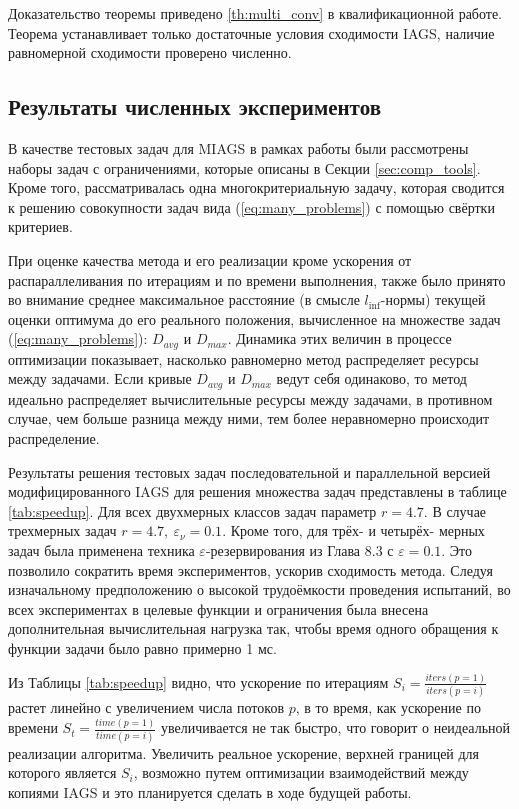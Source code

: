 Доказательство теоремы приведено \ref{th:multi_conv} в квалификационной работе.
Теорема  устанавливает только достаточные условия сходимости IAGS, наличие равномерной сходимости проверено численно.

\subsection{Результаты численных экспериментов}

В качестве тестовых задач для MIAGS в рамках работы были рассмотрены наборы задач с ограничениями, которые описаны в Секции \ref{sec:comp_tools}.
Кроме того, рассматривалась одна многокритериальную задачу, которая сводится к решению совокупности задач вида (\ref{eq:many_problems})
с помощью свёртки критериев.

При оценке качества метода и его реализации кроме ускорения от распараллеливания по итерациям и по времени выполнения,
также было принято во внимание среднее максимальное расстояние (в смысле \(l_{\inf}\)-нормы) текущей оценки оптимума до его реального положения,
вычисленное на множестве задач (\ref{eq:many_problems}): \(D_{avg}\) и \(D_{max}\). Динамика этих величин в процессе оптимизации
показывает, насколько равномерно метод распределяет ресурсы между задачами. Если кривые \(D_{avg}\) и \(D_{max}\) ведут себя одинаково, то
метод идеально распределяет вычислительные ресурсы между задачами, в противном случае, чем больше разница между
ними, тем более неравномерно происходит распределение.

Результаты решения тестовых задач последовательной и параллельной версией модифицированного IAGS
для решения множества задач представлены в таблице \ref{tab:speedup}. Для всех двухмерных классов задач параметр \(r=4.7\).
В случае трехмерных задач \(r=4.7,\: \varepsilon_\nu=0.1\).
Кроме того, для трёх- и четырёх- мерных задач была применена техника \(\varepsilon\)-резервирования из \cite{Strongin2000} Глава 8.3 с
\(\varepsilon=0.1\). Это позволило сократить время экспериментов, ускорив сходимость метода.
Следуя изначальному предположению о высокой трудоёмкости проведения испытаний,
во всех экспериментах в целевые функции и ограничения была внесена дополнительная вычислительная нагрузка так,
чтобы время одного обращения к функции задачи было равно примерно 1 мс.

Из Таблицы \ref{tab:speedup} видно, что ускорение по итерациям \(S_i=\frac{iters(p=1)}{iters(p=i)}\) растет линейно с увеличением числа потоков \(p\),
в то время, как ускорение по времени \(S_t=\frac{time(p=1)}{time(p=i)}\) увеличивается не так быстро, что говорит о неидеальной
реализации алгоритма. Увеличить реальное ускорение, верхней границей для которого является
\(S_i\), возможно путем оптимизации взаимодействий между копиями IAGS и это планируется сделать в ходе будущей работы.

